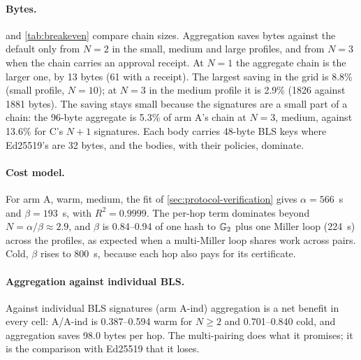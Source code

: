 \documentclass[11pt,a4paper]{article}
\begin{document}
\begin{figure}[t]
\centering
{}
\caption{\figcapPrefixHit}
\label{fig:prefix-hit}
\end{figure}

\paragraph{Bytes.}
 and \cref{tab:breakeven} compare chain sizes.
Aggregation saves bytes against the default only from $N = 2$ in the
small, medium and large profiles, and from $N = 3$ when the chain
carries an approval receipt. At $N = 1$ the aggregate chain is the
larger one, by 13 bytes (61 with a receipt). The largest saving in the
grid is 8.8\% (small profile, $N = 10$); at $N = 3$ in the medium
profile it is 2.9\% (1826 against 1881 bytes). The saving stays small
because the signatures are a small part of a chain: the 96-byte
aggregate is 5.3\% of arm A's chain at $N = 3$, medium, against 13.6\%
for C's $N{+}1$ signatures. Each body carries 48-byte BLS keys where
Ed25519's are 32 bytes, and the bodies, with their policies, dominate.

\begin{figure}[t]
\centering
{}
\caption{\figcapBytes}
\label{fig:bytes}
\end{figure}

\begin{table}[t]
\centering
\small
\caption{Chain bytes, arm A against arm C: the first $N$ at which A's
chain is the smaller, the difference at $N = 1$, and A's saving at
$N = 10$.}
\label{tab:breakeven}
\end{table}

\paragraph{Cost model.}
For arm A, warm, medium, the fit of \cref{sec:protocol-verification}
gives $\alpha = 566$~\textmu{}s and $\beta = 193$~\textmu{}s, with
$R^2 = 0.9999$. The per-hop term dominates beyond $N = \alpha/\beta
\approx 2.9$, and $\beta$ is 0.84--0.94 of one hash to $\mathbb{G}_{2}$ plus one
Miller loop (224~\textmu{}s) across the profiles, as expected when a
multi-Miller loop shares work across pairs. Cold, $\beta$ rises to
800~\textmu{}s, because each hop also pays for its certificate.

\paragraph{Aggregation against individual BLS.}
Against individual BLS signatures (arm A-ind) aggregation is a net
benefit in every cell: A/A-ind is 0.387--0.594 warm for $N \ge 2$ and
0.701--0.840 cold, and aggregation saves 98.0 bytes per hop. The
multi-pairing does what it promises; it is the comparison with Ed25519
that it loses.
\end{document}
